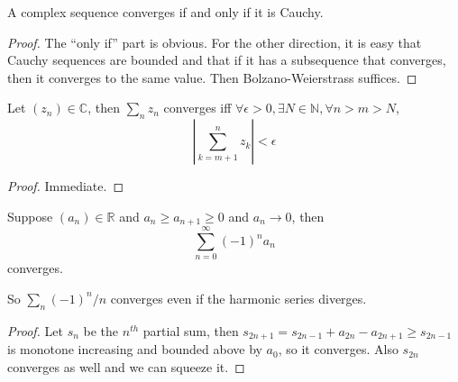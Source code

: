 \begin{proposition}
    A complex sequence converges if and only if it is Cauchy.
\end{proposition}
\begin{proof}
    The ``only if'' part is obvious.
    For the other direction, it is easy that Cauchy sequences are bounded and that if it has a subsequence that converges, then it converges to the same value.
    Then Bolzano-Weierstrass suffices.
\end{proof}
\begin{corollary}
    Let $(z_n)\in\mathbb C$, then $\sum_nz_n$ converges iff $\forall\epsilon>0,\exists N\in\mathbb N,\forall n>m>N$,
    $$\left|\sum_{k=m+1}^nz_k\right|<\epsilon$$
\end{corollary}
\begin{proof}
    Immediate.
\end{proof}
\begin{proposition}
    Suppose $(a_n)\in\mathbb R$ and $a_n\ge a_{n+1}\ge 0$ and $a_n\to 0$, then
    $$\sum_{n=0}^\infty(-1)^na_n$$
    converges.
\end{proposition}
\begin{example}
    So $\sum_n(-1)^n/n$ converges even if the harmonic series diverges.
\end{example}
\begin{proof}
    Let $s_n$ be the $n^{th}$ partial sum, then $s_{2n+1}=s_{2n-1}+a_{2n}-a_{2n+1}\ge s_{2n-1}$ is monotone increasing and bounded above by $a_0$, so it converges.
    Also $s_{2n}$ converges as well and we can squeeze it.
\end{proof}